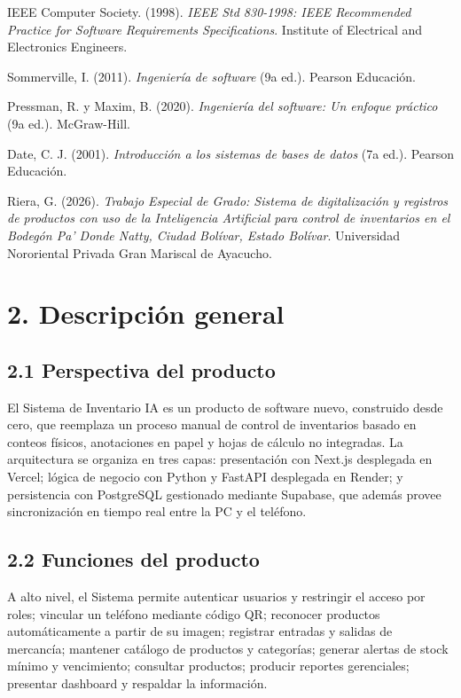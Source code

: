 \documentclass[12pt, letterpaper]{report}
\begin{document}
\setlength{\parindent}{0pt}
\setlength{\parskip}{6pt}
IEEE Computer Society. (1998). \textit{IEEE Std 830-1998: IEEE
Recommended Practice for Software Requirements Specifications}.
Institute of Electrical and Electronics Engineers.

Sommerville, I. (2011). \textit{Ingeniería de software} (9a ed.).
Pearson Educación.

Pressman, R. y Maxim, B. (2020). \textit{Ingeniería del software: Un
enfoque práctico} (9a ed.). McGraw-Hill.

Date, C. J. (2001). \textit{Introducción a los sistemas de bases de
datos} (7a ed.). Pearson Educación.

Riera, G. (2026). \textit{Trabajo Especial de Grado: Sistema de
digitalización y registros de productos con uso de la Inteligencia
Artificial para control de inventarios en el Bodegón Pa' Donde Natty,
Ciudad Bolívar, Estado Bolívar}. Universidad Nororiental Privada Gran
Mariscal de Ayacucho.
\setlength{\parindent}{1.25cm}
\setlength{\parskip}{0pt}

\section*{2. Descripción general}

\subsection*{2.1 Perspectiva del producto}

El Sistema de Inventario IA es un producto de software nuevo,
construido desde cero, que reemplaza un proceso manual de control de
inventarios basado en conteos físicos, anotaciones en papel y hojas
de cálculo no integradas. La arquitectura se organiza en tres capas:
presentación con Next.js desplegada en Vercel; lógica de negocio con
Python y FastAPI desplegada en Render; y persistencia con PostgreSQL
gestionado mediante Supabase, que además provee sincronización en
tiempo real entre la PC y el teléfono.

\subsection*{2.2 Funciones del producto}

A alto nivel, el Sistema permite autenticar usuarios y restringir el
acceso por roles; vincular un teléfono mediante código QR; reconocer
productos automáticamente a partir de su imagen; registrar entradas y
salidas de mercancía; mantener catálogo de productos y categorías;
generar alertas de stock mínimo y vencimiento; consultar productos;
producir reportes gerenciales; presentar dashboard y respaldar la
información.
\end{document}
